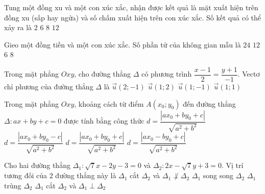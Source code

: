 \begin{ex}%
	Tung một đồng xu và một con xúc xắc, nhận được kết quả là mặt xuất hiện trên đồng xu (sấp hay ngửa) và số chấm xuất hiện trên con xúc xắc. Số kết quả có thể xảy ra là
	\choice
	{$2$}
	{$6$}
	{$8$}
	{\True $12$}
\end{ex}

\begin{ex}%
	Gieo một đồng tiền và một con xúc xắc. Số phần tử của không gian mẫu là
	\choice
	{$24$}
	{\True $12$}
	{$6$}
	{$8$}
\end{ex}

\begin{ex} %
	Trong mặt phẳng $O x y$, cho đường thẳng $\Delta$ có phương trình $\dfrac{x-1}{2}=\dfrac{y+1}{-1}$. Vectơ chỉ phương của đường thẳng $\Delta$ là
	\choice
	{\True $\vec{u}(2 ;-1)$}
	{$\vec{u}(1 ; 2)$}
	{$\vec{u}(1 ;-1)$}
	{$\vec{u}(1 ; 1)$}
\end{ex}

\begin{ex}
	Trong mặt phẳng $Oxy$, khoảng cách từ điểm $A(x_0;y_0)$ đến đường thẳng $\Delta \colon ax+by+c=0$ được tính bằng công thức
	\choice
	{$d=\dfrac{|ax_0+by_0+c|}{\sqrt{a^2+b^2}}$}
	{$d=\dfrac{|ax_0+by_0-c|}{\sqrt{a^2+b^2}}$}
	{\True $d=\dfrac{|ax_0+by_0+c|}{\sqrt{a^2+b^2}}$}
	{$d=\dfrac{|ax_0-by_0+c|}{\sqrt{a^2+b^2}}$}
\end{ex}

\begin{ex}%
	Cho hai đường thẳng $\Delta_1\colon \sqrt{7}x-2y-3=0$ và $\Delta_2\colon 2x-\sqrt{7}y+3=0$. Vị trí tương đối của $2$ đường thẳng này là
	\choice
	{\True $\Delta_1$ cắt $\Delta_2$ và $\Delta_1 \not \perp \Delta_2$}
	{$\Delta_1$ song song $\Delta_2$}
	{$\Delta_1$ trùng $\Delta_2$}
	{$\Delta_1$ cắt $\Delta_2$ và $\Delta_1 \perp \Delta_2$}
\end{ex}

